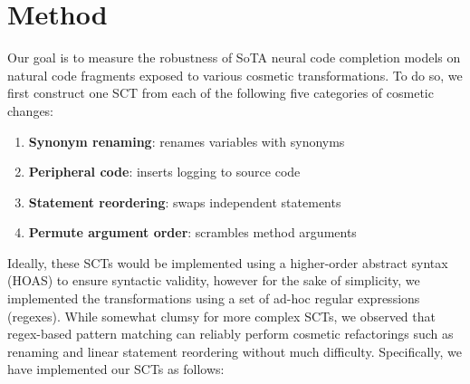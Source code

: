 \documentclass[usenames,dvipsnames]{article} %
\begin{document}


  \section{Method}\label{sec:method}

  Our goal is to measure the robustness of SoTA neural code completion models on natural code fragments exposed to various cosmetic transformations. To do so, we first construct one SCT from each of the following five categories of cosmetic changes:

  \begin{enumerate}[itemsep=1ex]
    \item \textbf{Synonym renaming}: renames variables with synonyms
    \item \textbf{Peripheral code}: inserts logging to source code
    \item \textbf{Statement reordering}: swaps independent statements
    \item \textbf{Permute argument order}: scrambles method arguments
  \end{enumerate}

  Ideally, these SCTs would be implemented using a higher-order abstract syntax (HOAS) to ensure syntactic validity, however for the sake of simplicity, we implemented the transformations using a set of ad-hoc regular expressions (regexes). While somewhat clumsy for more complex SCTs, we observed that regex-based pattern matching can reliably perform cosmetic refactorings such as renaming and linear statement reordering without much difficulty. Specifically, we have implemented our SCTs as follows:
\end{document}
